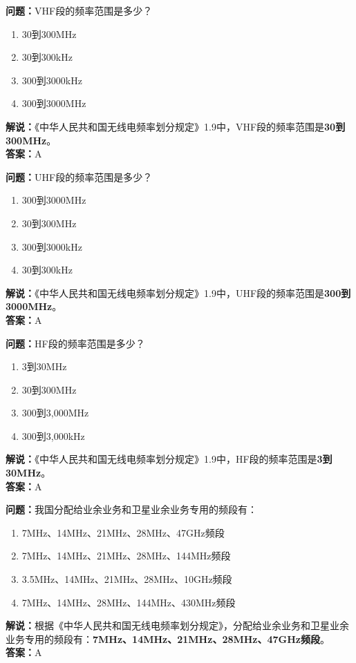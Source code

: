 \textbf{问题：}VHF段的频率范围是多少？
\begin{enumerate}[label=\Alph*), leftmargin=1cm]
	\item 30到300MHz
	\item 30到300kHz
	\item 300到3000kHz
	\item 300到3000MHz
\end{enumerate}
\textbf{解说：}《中华人民共和国无线电频率划分规定》1.9中，VHF段的频率范围是\textbf{30到300MHz}。\\\textbf{答案：}A

\textbf{问题：}UHF段的频率范围是多少？
\begin{enumerate}[label=\Alph*), leftmargin=1cm]
	\item 300到3000MHz
	\item 30到300MHz
	\item 300到3000kHz
	\item 30到300kHz
\end{enumerate}
\textbf{解说：}《中华人民共和国无线电频率划分规定》1.9中，UHF段的频率范围是\textbf{300到3000MHz}。\\\textbf{答案：}A

\textbf{问题：}HF段的频率范围是多少？
\begin{enumerate}[label=\Alph*), leftmargin=1cm]
	\item 3到30MHz
	\item 30到300MHz
	\item 300到3,000MHz
	\item 300到3,000kHz
\end{enumerate}
\textbf{解说：}《中华人民共和国无线电频率划分规定》1.9中，HF段的频率范围是\textbf{3到30MHz}。\\\textbf{答案：}A

\textbf{问题：}我国分配给业余业务和卫星业余业务专用的频段有：
\begin{enumerate}[label=\Alph*), leftmargin=1cm]
  \item 7MHz、14MHz、21MHz、28MHz、47GHz频段
  \item 7MHz、14MHz、21MHz、28MHz、144MHz频段
  \item 3.5MHz、14MHz、21MHz、28MHz、10GHz频段
  \item 7MHz、14MHz、28MHz、144MHz、430MHz频段
\end{enumerate}
\textbf{解说：}根据《中华人民共和国无线电频率划分规定》，分配给业余业务和卫星业余业务专用的频段有：\textbf{7MHz、14MHz、21MHz、28MHz、47GHz频段}。\\\textbf{答案：}A%

